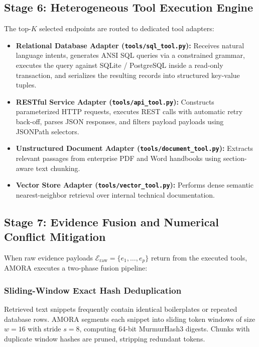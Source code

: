 \subsection{Stage 6: Heterogeneous Tool Execution Engine}
The top-$K$ selected endpoints are routed to dedicated tool adapters:
\begin{itemize}
    \item \textbf{Relational Database Adapter (\texttt{tools/sql\_tool.py}):} Receives natural language intents, generates ANSI SQL queries via a constrained grammar, executes the query against SQLite / PostgreSQL inside a read-only transaction, and serializes the resulting records into structured key-value tuples.
    \item \textbf{RESTful Service Adapter (\texttt{tools/api\_tool.py}):} Constructs parameterized HTTP requests, executes REST calls with automatic retry back-off, parses JSON responses, and filters payload payloads using JSONPath selectors.
    \item \textbf{Unstructured Document Adapter (\texttt{tools/document\_tool.py}):} Extracts relevant passages from enterprise PDF and Word handbooks using section-aware text chunking.
    \item \textbf{Vector Store Adapter (\texttt{tools/vector\_tool.py}):} Performs dense semantic nearest-neighbor retrieval over internal technical documentation.
\end{itemize}

\subsection{Stage 7: Evidence Fusion and Numerical Conflict Mitigation}
When raw evidence payloads $\mathcal{E}_{\text{raw}} = \{e_1, \dots, e_p\}$ return from the executed tools, AMORA executes a two-phase fusion pipeline:

\subsubsection{Sliding-Window Exact Hash Deduplication}
Retrieved text snippets frequently contain identical boilerplates or repeated database rows. AMORA segments each snippet into sliding token windows of size $w = 16$ with stride $s = 8$, computing 64-bit MurmurHash3 digests. Chunks with duplicate window hashes are pruned, stripping redundant tokens.

